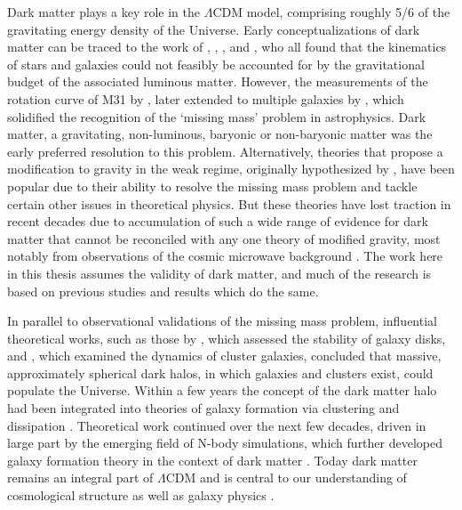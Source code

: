 Dark matter plays a key role in the $\Lambda$CDM model, comprising roughly 5/6 of the gravitating energy density of the Universe. Early conceptualizations of dark matter can be traced to the work of \textcite{kapteyn1922}, \textcite{oort32}, \textcite{zwicky33}, and \textcite{babcock39}, who all found that the kinematics of stars and galaxies could not feasibly be accounted for by the gravitational budget of the associated luminous matter. However, the measurements of the rotation curve of M31 by \textcite{rubin70}, later extended to multiple galaxies by \textcite{rubin80}, which solidified the recognition of the `missing mass' problem in astrophysics. Dark matter, a gravitating, non-luminous, baryonic or non-baryonic matter was the early preferred resolution to this problem. Alternatively, theories that propose a modification to gravity in the weak regime, originally hypothesized by \textcite{milgrom83}, have been popular due to their ability to resolve the missing mass problem and tackle certain other issues in theoretical physics. But these theories have lost traction in recent decades due to accumulation of such a wide range of evidence for dark matter that cannot be reconciled with any one theory of modified gravity, most notably from observations of the cosmic microwave background \parencite{netterfield02}. The work here in this thesis assumes the validity of dark matter, and much of the research is based on previous studies and results which do the same.

In parallel to observational validations of the missing mass problem, influential theoretical works, such as those by \textcite{ostriker73}, which assessed the stability of galaxy disks, and \textcite{einasto74}, which examined the dynamics of cluster galaxies, concluded that massive, approximately spherical dark halos, in which galaxies and clusters exist, could populate the Universe. Within a few years the concept of the dark matter halo had been integrated into theories of galaxy formation via clustering and dissipation \parencite{white78}. Theoretical work continued over the next few decades, driven in large part by the emerging field of N-body simulations, which further developed galaxy formation theory in the context of dark matter \parencite{white91}. Today dark matter remains an integral part of $\Lambda$CDM and is central to our understanding of cosmological structure as well as galaxy physics \parencite[e.g.][]{frenk12}.

